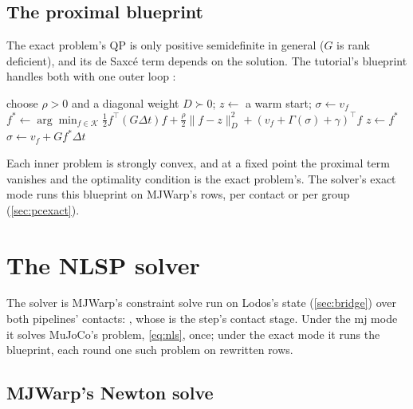 \subsection{The proximal blueprint}\label{sec:blueprint}

The exact problem's QP is only positive semidefinite in general ($G$ is rank deficient), and its de Saxc\'e term depends on the solution. The tutorial's blueprint handles both with one outer loop \cite{tutorial,rockafellar}:

\begin{algorithm}[h]
\caption{Proximal minimization with the de Saxc\'e correction (the tutorial's blueprint)}
\label{alg:blueprint}
\begin{algorithmic}[1]
\State choose $\rho > 0$ and a diagonal weight $D \succ 0$; $z \gets$ a warm start; $\sigma \gets v_f$
  \State $f^* \gets \arg\min_{f\in\mathcal K} \tfrac12 f^\top (G\Delta t) f + \tfrac\rho2 \lVert f - z\rVert_D^2 + (v_f + \Gamma(\sigma) + \gamma)^\top f$
  \State $z \gets f^*$ 
  \State $\sigma \gets v_f + G f^* \Delta t$ 
\EndWhile
\end{algorithmic}
\end{algorithm}

Each inner problem is strongly convex, and at a fixed point the proximal term vanishes and the optimality condition is the exact problem's. The solver's exact mode runs this blueprint on MJWarp's rows, per contact or per group (\cref{sec:pcexact}).

\section{The NLSP solver}\label{sec:nlsp}

The solver is MJWarp's constraint solve run on Lodos's state (\cref{sec:bridge}) over both pipelines' contacts: , whose  is the step's contact stage. Under the mj mode it solves MuJoCo's problem, \cref{eq:nls}, once; under the exact mode it runs the blueprint, each round one such problem on rewritten rows.

\subsection{MJWarp's Newton solve}\label{sec:mjwsolver}

